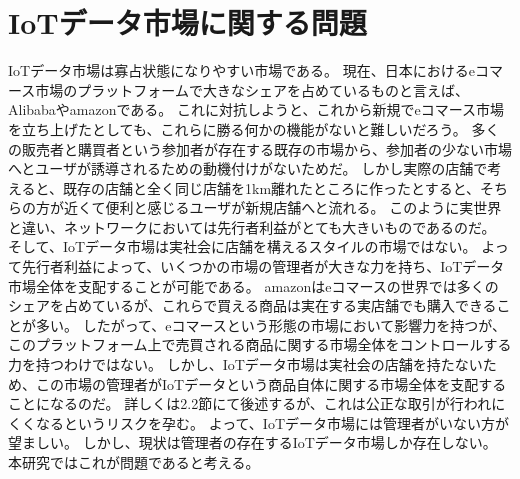 \section{IoTデータ市場に関する問題}
IoTデータ市場は寡占状態になりやすい市場である。
現在、日本におけるeコマース市場のプラットフォームで大きなシェアを占めているものと言えば、Alibabaやamazonである。
これに対抗しようと、これから新規でeコマース市場を立ち上げたとしても、これらに勝る何かの機能がないと難しいだろう。
多くの販売者と購買者という参加者が存在する既存の市場から、参加者の少ない市場へとユーザが誘導されるための動機付けがないためだ。
しかし実際の店舗で考えると、既存の店舗と全く同じ店舗を1km離れたところに作ったとすると、そちらの方が近くて便利と感じるユーザが新規店舗へと流れる。
このように実世界と違い、ネットワークにおいては先行者利益がとても大きいものであるのだ。
そして、IoTデータ市場は実社会に店舗を構えるスタイルの市場ではない。
よって先行者利益によって、いくつかの市場の管理者が大きな力を持ち、IoTデータ市場全体を支配することが可能である。
amazonはeコマースの世界では多くのシェアを占めているが、これらで買える商品は実在する実店舗でも購入できることが多い。
したがって、eコマースという形態の市場において影響力を持つが、このプラットフォーム上で売買される商品に関する市場全体をコントロールする力を持つわけではない。
しかし、IoTデータ市場は実社会の店舗を持たないため、この市場の管理者がIoTデータという商品自体に関する市場全体を支配することになるのだ。
詳しくは2.2節にて後述するが、これは公正な取引が行われにくくなるというリスクを孕む。
よって、IoTデータ市場には管理者がいない方が望ましい。
しかし、現状は管理者の存在するIoTデータ市場しか存在しない。
本研究ではこれが問題であると考える。

